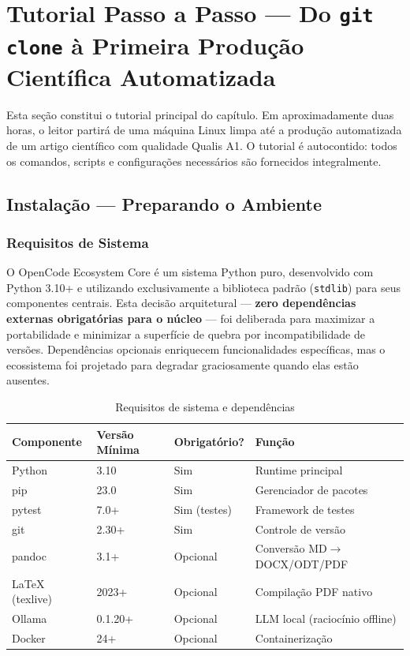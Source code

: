 \section{Tutorial Passo a Passo — Do \texttt{git clone} à Primeira Produção Científica Automatizada}
\label{sec:tutorial}

Esta seção constitui o tutorial principal do capítulo. Em aproximadamente duas horas, o leitor partirá de uma máquina Linux limpa até a produção automatizada de um artigo científico com qualidade Qualis A1. O tutorial é autocontido: todos os comandos, scripts e configurações necessários são fornecidos integralmente.

\subsection{Instalação — Preparando o Ambiente}
\label{sec:instalacao}

\subsubsection{Requisitos de Sistema}

O OpenCode Ecosystem Core é um sistema Python puro, desenvolvido com Python 3.10+ e utilizando exclusivamente a biblioteca padrão (\texttt{stdlib}) para seus componentes centrais. Esta decisão arquitetural — \textbf{zero dependências externas obrigatórias para o núcleo} — foi deliberada para maximizar a portabilidade e minimizar a superfície de quebra por incompatibilidade de versões. Dependências opcionais enriquecem funcionalidades específicas, mas o ecossistema foi projetado para degradar graciosamente quando elas estão ausentes.

\begin{table}[H]
\centering
\caption{Requisitos de sistema e dependências}
\label{tab:requisitos}
\begin{tabular}{@{}llll@{}}
\toprule
\textbf{Componente} & \textbf{Versão Mínima} & \textbf{Obrigatório?} & \textbf{Função} \\
\midrule
Python & 3.10 & Sim & Runtime principal \\
pip & 23.0 & Sim & Gerenciador de pacotes \\
pytest & 7.0+ & Sim (testes) & Framework de testes \\
git & 2.30+ & Sim & Controle de versão \\
pandoc & 3.1+ & Opcional & Conversão MD$\to$DOCX/ODT/PDF \\
\LaTeX{} (texlive) & 2023+ & Opcional & Compilação PDF nativo \\
Ollama & 0.1.20+ & Opcional & LLM local (raciocínio offline) \\
Docker & 24+ & Opcional & Containerização \\
\bottomrule
\end{tabular}
\end{table}

